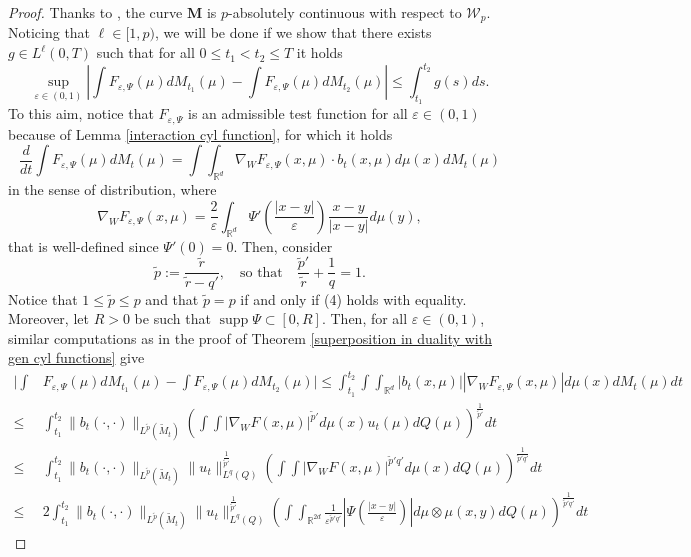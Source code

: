 \documentclass[10pt,leqno]{amsart}
\numberwithin{equation}{section}
\newcommand{\R}{\mathbb{R}}
\newcommand{\Q}{\mathbb{Q}}
\renewcommand{\Q}{Q}
\begin{document}
\begin{proof}
    Thanks to \cite[Proposition 4.10]{pinzisavare2025}, the curve $\boldsymbol{M}$ is $p$-absolutely continuous with respect to $\mathcal{W}_p$. Noticing that $\ell\in [1,p)$, we will be done if we show that there exists $g\in L^\ell(0,T)$ such that for all $0\leq t_1 < t_2 \leq T$ it holds
    \begin{equation}
        \sup_{\varepsilon\in(0,1)} \left| \int F_{\varepsilon,\Psi}(\mu) dM_{t_1}(\mu) - \int F_{\varepsilon,\Psi}(\mu) dM_{t_2}(\mu) \right| \leq \int_{t_1}^{t_2} g(s) ds.
    \end{equation}
    To this aim, notice that $F_{\varepsilon,\Psi}$ is an admissible test function for all $\varepsilon\in(0,1)$ because of Lemma \ref{interaction cyl function}, for which it holds
    \[\frac{d}{dt} \int F_{\varepsilon,\Psi}(\mu) dM_t(\mu) = \int \int_{\R^d} \nabla_WF_{\varepsilon,\Psi}(x,\mu) \cdot b_t(x,\mu) d\mu(x)dM_t(\mu)\]
    in the sense of distribution, where 
    \[\nabla_WF_{\varepsilon,\Psi}(x,\mu) = \frac{2}{\varepsilon}\int_{\R^d} \Psi'\left(\frac{|x-y|}{\varepsilon}\right) \frac{x-y}{|x-y|} d\mu(y),\]
    that is well-defined since $\Psi'(0) = 0$. Then, consider
    \[ \tilde{p}:= \frac{\tilde{r}}{\tilde{r}-q'}, \quad \text{so that} \quad \frac{\tilde{p}'}{\tilde{r}} + \frac{1}{q} = 1.\]
    Notice that $1\leq \tilde{p} \leq p$ and that $\tilde{p} = p$ if and only if (4) holds with equality. Moreover, let $R>0$ be such that $\operatorname{supp}\Psi \subset [0,R]$. Then, for all $\varepsilon\in(0,1)$, similar computations as in the proof of Theorem \ref{superposition in duality with gen cyl functions} give    \begin{align*}
        \bigg| \int & F_{\varepsilon,\Psi}(\mu) dM_{t_1}(\mu) - \int F_{\varepsilon,\Psi}(\mu) dM_{t_2}(\mu) \bigg| \leq \int_{t_1}^{t_2} \int \int_{\R^d} |b_t(x,\mu)| |\nabla_W F_{\varepsilon,\Psi}(x,\mu)|d\mu(x)dM_{t}(\mu) dt
        \\
        \leq & \int_{t_1}^{t_2} \|b_t(\cdot,\cdot)\|_{L^{\tilde{p}}(\widetilde{M}_t)} \left( \int \int |\nabla_W F(x,\mu)|^{\tilde{p}'} d\mu(x) u_{t}(\mu)d\Q(\mu) \right)^{\frac{1}{\tilde{p}'}} dt
        \\
        \leq & \int_{t_1}^{t_2} \|b_t(\cdot,\cdot)\|_{L^{\tilde{p}}(\widetilde{M}_t)} \|u_t\|_{L^q(Q)}^{\frac{1}{\tilde{p}'}} \left( \int \int |\nabla_W F(x,\mu)|^{\tilde{p}'q'} d\mu(x) d\Q(\mu) \right)^{\frac{1}{\tilde{p}'q'}} dt
        \\
        \leq & 2 \int_{t_1}^{t_2} \|b_t(\cdot,\cdot)\|_{L^{\tilde{p}}(\widetilde{M}_t)} \|u_t\|_{L^q(Q)}^{\frac{1}{\tilde{p}'}} \left( \int \int_{\R^{2d}} \frac{1}{\varepsilon^{\tilde{p}'q'}} \left| \Psi\left(\frac{|x-y|}{\varepsilon}\right) \right| d\mu\otimes \mu(x,y) d\Q(\mu) \right)^{\frac{1}{\tilde{p}'q'}} dt

\end{align*}
\end{proof}
\end{document}
